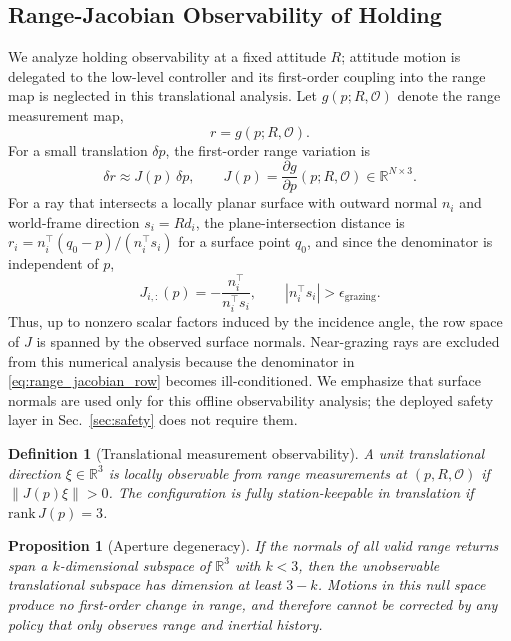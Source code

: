 \documentclass[11pt]{article}
\newtheorem{definition}{Definition}
\newtheorem{proposition}{Proposition}
\begin{document}
\subsection{Range-Jacobian Observability of Holding}
\label{sec:observability}

We analyze holding observability at a fixed attitude $R$; attitude motion is
delegated to the low-level controller and its first-order coupling into the
range map is neglected in this translational analysis. Let $g(p;R,\mathcal{O})$
denote the range measurement map,
\begin{equation}
    r = g(p;R,\mathcal{O}).
    \label{eq:measurement_map}
\end{equation}
For a small translation $\delta p$, the first-order range variation is
\begin{equation}
    \delta r \approx J(p)\,\delta p, \qquad
    J(p)=\frac{\partial g}{\partial p}(p;R,\mathcal{O}) \in \mathbb{R}^{N\times 3}.
    \label{eq:range_jacobian}
\end{equation}
For a ray that intersects a locally planar surface with outward normal $n_i$
and world-frame direction $s_i=R d_i$, the plane-intersection distance is
$r_i = n_i^\top(q_0-p)/(n_i^\top s_i)$ for a surface point $q_0$, and since the
denominator is independent of $p$,
\begin{equation}
    J_{i,:}(p)
    = -\frac{n_i^\top}{n_i^\top s_i},
    \qquad |n_i^\top s_i|>\epsilon_{\mathrm{grazing}}.
    \label{eq:range_jacobian_row}
\end{equation}
Thus, up to nonzero scalar factors induced by the incidence angle, the row
space of $J$ is spanned by the observed surface normals. Near-grazing rays are
excluded from this numerical analysis because the denominator in
\eqref{eq:range_jacobian_row} becomes ill-conditioned. We emphasize that surface
normals are used only for this offline observability analysis; the deployed
safety layer in Sec.~\ref{sec:safety} does not require them.

\begin{definition}[Translational measurement observability]
A unit translational direction $\xi \in \mathbb{R}^3$ is locally observable from
range measurements at $(p,R,\mathcal{O})$ if $\|J(p)\xi\|>0$. The configuration
is fully station-keepable in translation if $\mathrm{rank}\,J(p)=3$.
\end{definition}

\begin{proposition}[Aperture degeneracy]
If the normals of all valid range returns span a $k$-dimensional subspace of
$\mathbb{R}^3$ with $k<3$, then the unobservable translational subspace has
dimension at least $3-k$. Motions in this null space produce no first-order
change in range, and therefore cannot be corrected by any policy that only
observes range and inertial history.
\label{prop:aperture}
\end{proposition}
\end{document}

